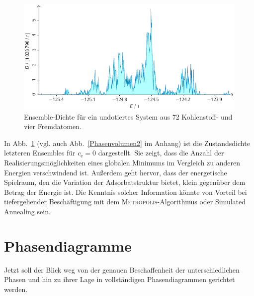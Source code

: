 \documentclass[a4paper, 10pt, twoside, openany]{book} %
\def \cE {c_\mathrm{e}}
\begin{document}
	\begin{figure}
		\includegraphics[width=\textwidth]{Abbildungen/Zustandsdichten/75.pdf}
		\caption[Ensemble-Dichte ohne Dotierung]{Ensemble-Dichte für ein undotiertes System aus 72 Kohlenstoff- und vier Fremdatomen.}
		\label{Phasenvolumen}
	\end{figure}
	In Abb.~\ref{Phasenvolumen} (vgl. auch Abb.~\ref{Phasenvolumen2} im Anhang) ist die Zustandsdichte letzteren Ensembles für $\cE = 0$ dargestellt. Sie zeigt, dass die Anzahl der Realisierungsmöglichkeiten eines globalen Minimums im Vergleich zu anderen Energien verschwindend ist. Außerdem geht hervor, dass der energetische Spielraum, den die Variation der Adsorbatstruktur bietet, klein gegenüber dem Betrag der Energie ist. Die Kenntnis solcher Information könnte von Vorteil bei tiefergehender Beschäftigung mit dem \textsc{Metropolis}-Algorithmus oder Simulated Annealing sein.
	
	\section{Phasendiagramme}
	\label{Phasendiagramme}
	
	Jetzt soll der Blick weg von der genauen Beschaffenheit der unterschiedlichen Phasen und hin zu ihrer Lage in vollständigen Phasendiagrammen gerichtet werden.
	
\end{document}

